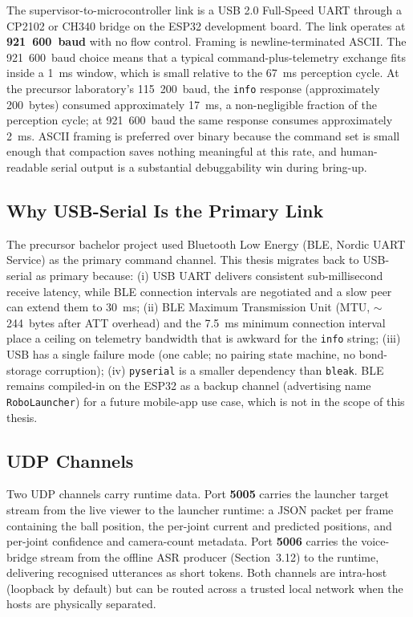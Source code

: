 The supervisor-to-microcontroller link is a USB 2.0 Full-Speed UART through a CP2102 or CH340 bridge on the ESP32 development board. The link operates at \textbf{921~600~baud} with no flow control. Framing is newline-terminated ASCII. The 921~600~baud choice means that a typical command-plus-telemetry exchange fits inside a 1~ms window, which is small relative to the 67~ms perception cycle. At the precursor laboratory's 115~200~baud, the \texttt{info} response (approximately 200~bytes) consumed approximately 17~ms, a non-negligible fraction of the perception cycle; at 921~600~baud the same response consumes approximately 2~ms. ASCII framing is preferred over binary because the command set is small enough that compaction saves nothing meaningful at this rate, and human-readable serial output is a substantial debuggability win during bring-up.

\subsection{Why USB-Serial Is the Primary Link}

The precursor bachelor project used Bluetooth Low Energy (BLE, Nordic UART Service) as the primary command channel. This thesis migrates back to USB-serial as primary because: (i) USB UART delivers consistent sub-millisecond receive latency, while BLE connection intervals are negotiated and a slow peer can extend them to 30~ms; (ii) BLE Maximum Transmission Unit (MTU, $\sim$244~bytes after ATT overhead) and the 7.5~ms minimum connection interval place a ceiling on telemetry bandwidth that is awkward for the \texttt{info} string; (iii) USB has a single failure mode (one cable; no pairing state machine, no bond-storage corruption); (iv) \texttt{pyserial} is a smaller dependency than \texttt{bleak}. BLE remains compiled-in on the ESP32 as a backup channel (advertising name \texttt{RoboLauncher}) for a future mobile-app use case, which is not in the scope of this thesis.

\subsection{UDP Channels}

Two UDP channels carry runtime data. Port \textbf{5005} carries the launcher target stream from the live viewer to the launcher runtime: a JSON packet per frame containing the ball position, the per-joint current and predicted positions, and per-joint confidence and camera-count metadata. Port \textbf{5006} carries the voice-bridge stream from the offline ASR producer (Section~3.12) to the runtime, delivering recognised utterances as short tokens. Both channels are intra-host (loopback by default) but can be routed across a trusted local network when the hosts are physically separated.

